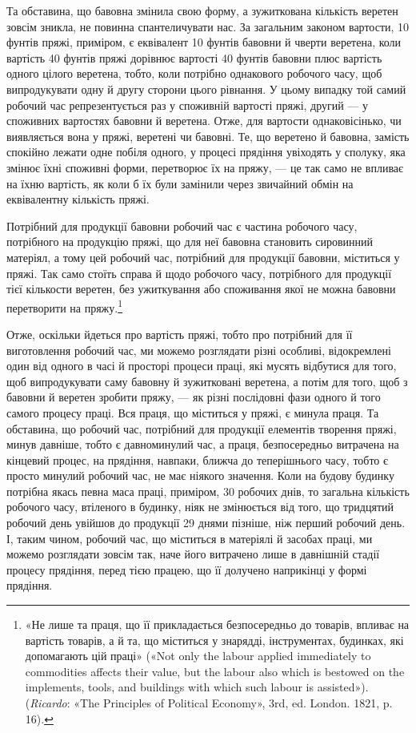 Та обставина, що бавовна змінила свою форму, а зужиткована
кількість веретен зовсім зникла, не повинна спантеличувати
нас. За загальним законом вартости, 10 фунтів пряжі, приміром,
є еквівалент 10 фунтів бавовни й чверти веретена, коли вартість
40 фунтів пряжі дорівнює вартості 40 фунтів бавовни плюс вартість
одного цілого веретена, тобто, коли потрібно однакового
робочого часу, щоб випродукувати одну й другу сторони цього
рівнання. У цьому випадку той самий робочий час репрезентується
раз у споживній вартості пряжі, другий — у споживних
вартостях бавовни й веретена. Отже, для вартости однаковісінько,
чи виявляється вона у пряжі, веретені чи бавовні. Те, що
веретено й бавовна, замість спокійно лежати одне побіля одного,
у процесі прядіння увіходять у сполуку, яка змінює їхні споживні
форми, перетворює їх на пряжу, — це так само не впливає на
їхню вартість, як коли б їх були замінили через звичайний обмін
на еквівалентну кількість пряжі.

Потрібний для продукції бавовни робочий час є частина робочого
часу, потрібного на продукцію пряжі, що для неї бавовна
становить сировинний матеріял, а тому цей робочий час, потрібний
для продукції бавовни, міститься у пряжі. Так само стоїть
справа й щодо робочого часу, потрібного для продукції тієї кількости
веретен, без ужиткування або споживання якої не можна
бавовни перетворити на пряжу.\footnote{
«Не лише та праця, що її прикладається безпосередньо до товарів,
впливає на вартість товарів, а й та, що міститься у знарядді, інструментах,
будинках, які допомагають цій праці» («Not only the labour applied
immediately to commodities affects their value, but the labour also which
is bestowed on the implements, tools, and buildings with which such
labour is assisted»). (\emph{Ricardo}: «The Principles of Political Economy», 3rd,
ed. London. 1821, p. 16).
}

Отже, оскільки йдеться про вартість пряжі, тобто про потрібний
для її виготовлення робочий час, ми можемо розглядати різні
особливі, відокремлені один від одного в часі й просторі процеси
праці, які мусять відбутися для того, щоб випродукувати саму
бавовну й зужитковані веретена, а потім для того, щоб з бавовни
й веретен зробити пряжу, — як різні послідовні фази одного й
того самого процесу праці. Вся праця, що міститься у пряжі,
є минула праця. Та обставина, що робочий час, потрібний для
продукції елементів творення пряжі, минув давніше, тобто є
давноминулий час, а праця, безпосередньо витрачена на кінцевий
процес, на прядіння, навпаки, ближча до теперішнього часу,
тобто є просто минулий робочий час, не має ніякого значення.
Коли на будову будинку потрібна якась певна маса праці, приміром,
30 робочих днів, то загальна кількість робочого часу,
втіленого в будинку, ніяк не змінюється від того, що тридцятий
робочий день увійшов до продукції 29 днями пізніше, ніж перший
робочий день. І, таким чином, робочий час, що міститься в матеріялі
й засобах праці, ми можемо розглядати зовсім так, наче
його витрачено лише в давнішній стадії процесу прядіння, перед
тією працею, що її долучено наприкінці у формі прядіння.

